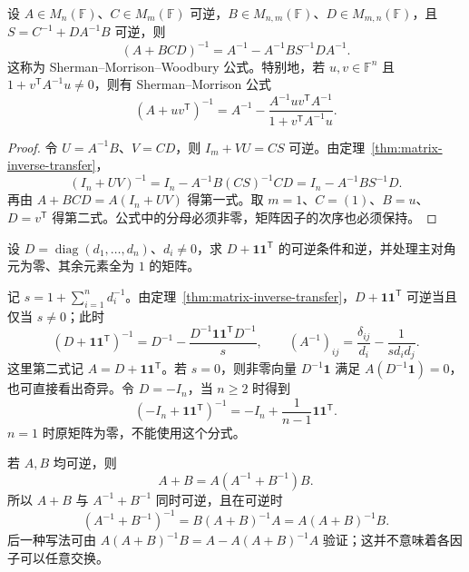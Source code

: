 \begin{theorem}
\label{thm:matrix-woodbury}
设 $A\in M_n(\mathbb F)$、$C\in M_m(\mathbb F)$ 可逆，$B\in M_{n,m}(\mathbb F)$、$D\in M_{m,n}(\mathbb F)$，且 $S=C^{-1}+DA^{-1}B$ 可逆，则
\begin{equation}
 (A+BCD)^{-1}
 =A^{-1}-A^{-1}BS^{-1}DA^{-1}.
 \label{eq:matrix-woodbury}
\end{equation}
这称为 Sherman--Morrison--Woodbury 公式。特别地，若 $u,v\in\mathbb F^n$ 且 $1+v^{\mathsf T}A^{-1}u\ne0$，则有 Sherman--Morrison 公式
\begin{equation}
 (A+uv^{\mathsf T})^{-1}
 =A^{-1}-\frac{A^{-1}uv^{\mathsf T}A^{-1}}{1+v^{\mathsf T}A^{-1}u}.
 \label{eq:matrix-sherman-morrison}
\end{equation}
\end{theorem}
\begin{proof}
令 $U=A^{-1}B$、$V=CD$，则 $I_m+VU=CS$ 可逆。由定理~\ref{thm:matrix-inverse-transfer}，
\[
 (I_n+UV)^{-1}
 =I_n-A^{-1}B(CS)^{-1}CD
 =I_n-A^{-1}BS^{-1}D.
\]
再由 $A+BCD=A(I_n+UV)$ 得第一式。取 $m=1$、$C=(1)$、$B=u$、$D=v^{\mathsf T}$ 得第二式。公式中的分母必须非零，矩阵因子的次序也必须保持。
\end{proof}

\begin{example}
\label{ex:matrix-diagonal-rank-one-inverse}
设 $D=\operatorname{diag}(d_1,\ldots,d_n)$、$d_i\ne0$，求 $D+\mathbf1\mathbf1^{\mathsf T}$ 的可逆条件和逆，并处理主对角元为零、其余元素全为 $1$ 的矩阵。
\end{example}
\begin{solve}
记 $s=1+\sum_{i=1}^n d_i^{-1}$。由定理~\ref{thm:matrix-inverse-transfer}，$D+\mathbf1\mathbf1^{\mathsf T}$ 可逆当且仅当 $s\ne0$；此时
\begin{equation}
 (D+\mathbf1\mathbf1^{\mathsf T})^{-1}
 =D^{-1}-\frac{D^{-1}\mathbf1\mathbf1^{\mathsf T}D^{-1}}s,
 \qquad (A^{-1})_{ij}=\frac{\delta_{ij}}{d_i}-\frac1{sd_id_j}.
 \label{eq:matrix-diagonal-rank-one-inverse}
\end{equation}
这里第二式记 $A=D+\mathbf1\mathbf1^{\mathsf T}$。若 $s=0$，则非零向量 $D^{-1}\mathbf1$ 满足 $A(D^{-1}\mathbf1)=0$，也可直接看出奇异。令 $D=-I_n$，当 $n\ge2$ 时得到
\[
 (-I_n+\mathbf1\mathbf1^{\mathsf T})^{-1}
 =-I_n+\frac1{n-1}\mathbf1\mathbf1^{\mathsf T}.
\]
$n=1$ 时原矩阵为零，不能使用这个分式。
\end{solve}

若 $A,B$ 均可逆，则
\[
 A+B=A(A^{-1}+B^{-1})B.
\]
所以 $A+B$ 与 $A^{-1}+B^{-1}$ 同时可逆，且在可逆时
\[
 (A^{-1}+B^{-1})^{-1}=B(A+B)^{-1}A=A(A+B)^{-1}B.
\]
后一种写法可由 $A(A+B)^{-1}B=A-A(A+B)^{-1}A$ 验证；这并不意味着各因子可以任意交换。

